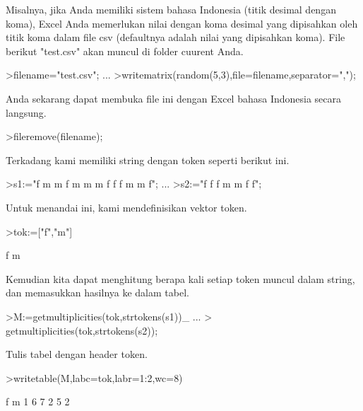 \documentclass[a4paper,10pt]{article}
\begin{document}
\begin{eulernotebook}
\begin{eulercomment}
\begin{eulercomment}
\begin{eulercomment}
\begin{eulercomment}
\begin{eulercomment}
\begin{eulercomment}
\begin{eulercomment}
\begin{eulercomment}
\begin{eulercomment}
\begin{eulercomment}
\begin{eulercomment}
\begin{eulercomment}
\begin{eulercomment}
\begin{eulercomment}
\begin{eulercomment}
\begin{eulercomment}
\begin{eulercomment}
\begin{eulercomment}
\begin{eulercomment}
Misalnya, jika Anda memiliki sistem bahasa Indonesia (titik desimal
dengan koma), Excel Anda memerlukan nilai dengan koma desimal yang
dipisahkan oleh titik koma dalam file csv (defaultnya adalah nilai
yang dipisahkan koma). File berikut "test.csv" akan muncul di folder
cuurent Anda.
\end{eulercomment}
\begin{eulerprompt}
>filename="test.csv"; ...
>writematrix(random(5,3),file=filename,separator=",");
\end{eulerprompt}
\begin{eulercomment}
Anda sekarang dapat membuka file ini dengan Excel bahasa Indonesia
secara langsung.
\end{eulercomment}
\begin{eulerprompt}
>fileremove(filename);
\end{eulerprompt}
\begin{eulercomment}
Terkadang kami memiliki string dengan token seperti berikut ini.
\end{eulercomment}
\begin{eulerprompt}
>s1:="f m m f m m m f f f m m f";  ...
>s2:="f f f m m f f";
\end{eulerprompt}
\begin{eulercomment}
Untuk menandai ini, kami mendefinisikan vektor token.
\end{eulercomment}
\begin{eulerprompt}
>tok:=["f","m"]
\end{eulerprompt}
\begin{euleroutput}
  f
  m
\end{euleroutput}
\begin{eulercomment}
Kemudian kita dapat menghitung berapa kali setiap token muncul dalam
string, dan memasukkan hasilnya ke dalam tabel.
\end{eulercomment}
\begin{eulerprompt}
>M:=getmultiplicities(tok,strtokens(s1))_ ...
>  getmultiplicities(tok,strtokens(s2));
\end{eulerprompt}
\begin{eulercomment}
Tulis tabel dengan header token.
\end{eulercomment}
\begin{eulerprompt}
>writetable(M,labc=tok,labr=1:2,wc=8)
\end{eulerprompt}
\begin{euleroutput}
                 f       m
         1       6       7
         2       5       2

\end{euleroutput}
\end{eulercomment}
\end{eulercomment}
\end{eulercomment}
\end{eulercomment}
\end{eulercomment}
\end{eulercomment}
\end{eulercomment}
\end{eulercomment}
\end{eulercomment}
\end{eulercomment}
\end{eulercomment}
\end{eulercomment}
\end{eulercomment}
\end{eulercomment}
\end{eulercomment}
\end{eulercomment}
\end{eulercomment}
\end{eulercomment}
\end{eulernotebook}
\end{document}
